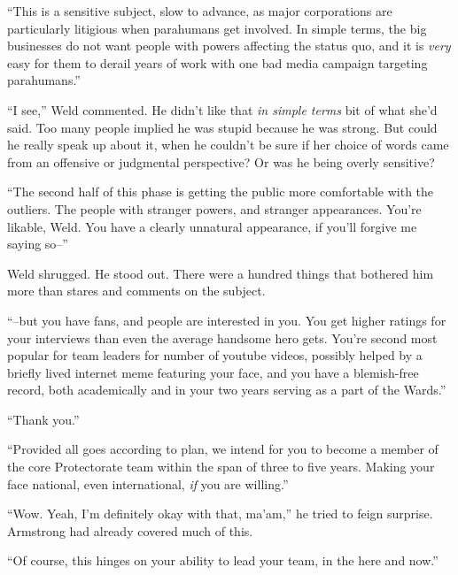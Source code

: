 ``This is a sensitive subject, slow to advance, as major corporations are particularly litigious when parahumans get involved.  In simple terms, the big businesses do not want people with powers affecting the status quo, and it is \emph{very} easy for them to derail years of work with one bad media campaign targeting parahumans.''



``I see,'' Weld commented.  He didn't like that \emph{in simple terms} bit of what she'd said.  Too many people implied he was stupid because he was strong.  But could he really speak up about it, when he couldn't be sure if her choice of words came from an offensive or judgmental perspective?  Or was he being overly sensitive?



``The second half of this phase is getting the public more comfortable with the outliers.  The people with stranger powers, and stranger appearances.  You're likable, Weld.  You have a clearly unnatural appearance, if you'll forgive me saying so--''



Weld shrugged.  He stood out.  There were a hundred things that bothered him more than stares and comments on the subject.



``--but you have fans, and people are interested in you.  You get higher ratings for your interviews than even the average handsome hero gets.  You're second most popular for team leaders for number of youtube videos, possibly helped by a briefly lived internet meme featuring your face, and you have a blemish-free record, both academically and in your two years serving as a part of the Wards.''



``Thank you.''



``Provided all goes according to plan, we intend for you to become a member of the core Protectorate team within the span of three to five years.  Making your face national, even international,\emph{ if} you are willing.''



``Wow.  Yeah, I'm definitely okay with that, ma'am,'' he tried to feign surprise.  Armstrong had already covered much of this.



``Of course, this hinges on your ability to lead your team, in the here and now.''



